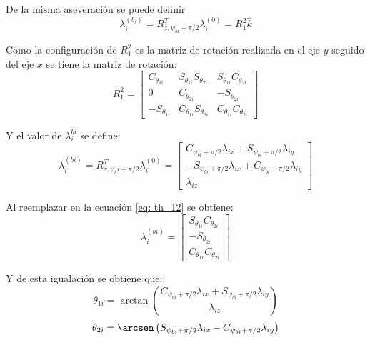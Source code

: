 De la misma aseveración se puede definir
\begin{equation} \label{eq: th_12}
\lambda_i^{(b_i)} = R^T_{z,\psi_{bi}+\pi/2} \lambda_i^{(0)} =R_1^2 \hat{k}
\end{equation}

Como la configuración de $R_1^2$ es la matriz de rotación realizada en el eje $y$ seguido del eje $x$ se tiene la matriz de rotación:
\begin{equation}
R_1^2 = \begin{bmatrix}
C_{\theta_{1i}} & S_{\theta_{1i}} S_{\theta_{2i}} & S_{\theta_{1i}} C_{\theta_{2i}}\\
0 & C_{\theta_{2i}} & -S_{\theta_{2i}}\\
-S_{\theta_{1i}} & C_{\theta_{1i}} S_{\theta_{2i}} & C_{\theta_{1i}} C_{\theta_{2i}}
\end{bmatrix}
\end{equation}

Y el valor de $\lambda_i^{bi}$ se define:
\begin{equation}
\lambda_i^{(bi)} = R^T_{z,\psi_bi+\pi/2} \lambda_i^{(0)} = \begin{bmatrix}
C_{\psi_{bi}+\pi/2} \lambda_{ix} + S_{\psi_{bi}+\pi/2} \lambda_{iy} \\
-S_{\psi_{bi}+\pi/2} \lambda_{ix} + C_{\psi_{bi}+\pi/2} \lambda_{iy} \\
\lambda_{iz}
\end{bmatrix}
\end{equation}

Al reemplazar en la ecuación \ref{eq: th_12} se obtiene:
\begin{equation}
\lambda_i^{(bi)} = \begin{bmatrix}
S_{\theta_{1i}} C_{\theta_{2i}}\\
-S_{\theta_{2i}}\\
C_{\theta_{1i}} C_{\theta_{2i}}
\end{bmatrix}
\end{equation}

Y de esta igualación se obtiene que:
\begin{equation}
\theta_{1i} = \arctan\left(\frac{C_{\psi_{bi}+\pi/2} \lambda_{ix} + S_{\psi_{bi}+\pi/2} \lambda_{iy}}{\lambda_{iz}}\right)
\end{equation}
\begin{equation}
\theta_{2i} = \arcsen\left(S_{\psi_{bi}+\pi/2} \lambda_{ix} - C_{\psi_{bi}+\pi/2} \lambda_{iy}\right)
\end{equation}

